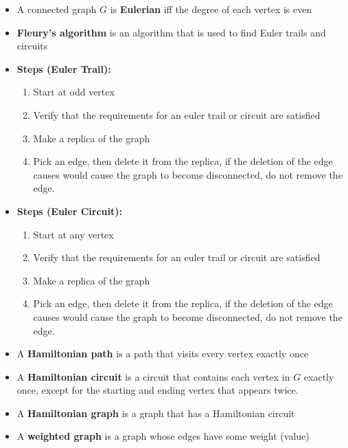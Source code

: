 \documentclass{report}
\begin{document}
\begin{itemize}
        \item A connected graph $G$ is \textbf{Eulerian} iff the degree of each vertex is even
        \item \textbf{Fleury's algorithm} is an algorithm that is used to find Euler trails and circuits 
        \item \textbf{Steps (Euler Trail):}
        \begin{enumerate}
            \item Start at odd vertex
            \item Verify that the requirements for an euler trail or circuit are satisfied
            \item Make a replica of the graph
            \item Pick an edge, then delete it from the replica, if the deletion of the edge causes would cause the graph to become disconnected, do not remove the edge.
        \end{enumerate}
        \item \textbf{Steps (Euler Circuit):}
        \begin{enumerate}
            \item Start at any vertex
            \item Verify that the requirements for an euler trail or circuit are satisfied
            \item Make a replica of the graph
            \item Pick an edge, then delete it from the replica, if the deletion of the edge causes would cause the graph to become disconnected, do not remove the edge.
        \end{enumerate}
        \item A \textbf{Hamiltonian path} is a path that visits every vertex exactly once  
        \item A \textbf{Hamiltonian circuit} is a circuit that contains each vertex in $G$ exactly once, except for the starting and ending vertex that appears twice.
        \item A \textbf{Hamiltonian graph} is a graph that has a Hamiltonian circuit
        \item A \textbf{weighted graph} is a graph whose edges have some weight (value) 
      \end{itemize}

      \pagebreak \bigbreak \noindent 
\end{document}
